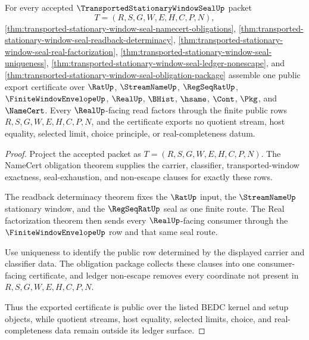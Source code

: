\begin{theorem}
\label{thm:transported-stationary-window-seal-public-export-certificate}
For every accepted $\TransportedStationaryWindowSealUp$ packet
$$
T=(R,S,G,W,E,H,C,P,N),
$$
\autoref{thm:transported-stationary-window-seal-namecert-obligations}, \autoref{thm:transported-stationary-window-seal-readback-determinacy}, \autoref{thm:transported-stationary-window-seal-real-factorization}, \autoref{thm:transported-stationary-window-seal-uniqueness}, \autoref{thm:transported-stationary-window-seal-ledger-nonescape}, and \autoref{thm:transported-stationary-window-seal-obligation-package} assemble one public export certificate over $\RatUp$, $\StreamNameUp$, $\RegSeqRatUp$, $\FiniteWindowEnvelopeUp$, $\RealUp$, $\BHist$, $\hsame$, $\Cont$, $\Pkg$, and $\NameCert$. Every $\RealUp$-facing read factors through the finite public rows $R,S,G,W,E,H,C,P,N$, and the certificate exports no quotient stream, host equality, selected limit, choice principle, or real-completeness datum.
\end{theorem}
\begin{proof}
Project the accepted packet as $T=(R,S,G,W,E,H,C,P,N)$. The NameCert obligation theorem supplies the carrier, classifier, transported-window exactness, seal-exhaustion, and non-escape clauses for exactly these rows.

The readback determinacy theorem fixes the $\RatUp$ input, the $\StreamNameUp$ stationary window, and the $\RegSeqRatUp$ seal as one finite route. The Real factorization theorem then sends every $\RealUp$-facing consumer through the $\FiniteWindowEnvelopeUp$ row and that same seal route.

Use uniqueness to identify the public row determined by the displayed carrier and classifier data. The obligation package collects these clauses into one consumer-facing certificate, and ledger non-escape removes every coordinate not present in $R,S,G,W,E,H,C,P,N$.

Thus the exported certificate is public over the listed BEDC kernel and setup objects, while quotient streams, host equality, selected limits, choice, and real-completeness data remain outside its ledger surface.
\end{proof}

